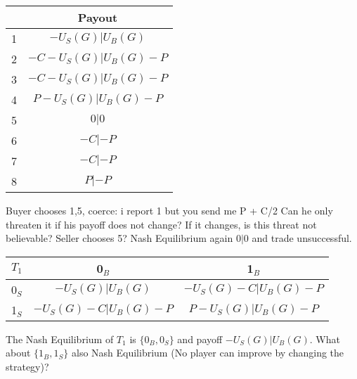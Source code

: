 \documentclass{cacthesis}
\begin{document}
\begin{center}
\begin{tabular}{ |c|c| }
\hline
& Payout  \\
\hline
\hline
1& $-U_S(G)| U_B(G)$\\
\hline
2& $-C-U_S(G)|U_B(G) -P$\\
\hline
3&$-C-U_S(G)|U_B(G)-P$ \\
\hline
4& $P-U_S(G)| U_B(G) - P$\\
\hline
5& $0|0$\\
\hline 
6& $-C | -P$\\
\hline
7& $-C|-P$\\
\hline
8& $P| -P$\\
\hline
\end{tabular}
\end{center}

Buyer chooses 1,5, coerce: i report 1 but you send me P + C/2\newline
Can he only threaten it if his payoff does not change? If it changes, is this threat not believable?\newline
Seller chooses 5?\newline
Nash Equilibrium again $0|0$ and trade unsuccessful. 


\begin{center}
\begin{tabular}{ c||c|c| }
$T_1$& 0$_B$ & 1$_B$   \\
\hline
\hline
0$_S$ & $-U_S(G) | U_B(G)$ & $-U_S(G) - C | U_B(G) - P$ \\
\hline
1$_S$ & $-U_S(G) - C | U_B(G) - P$ & $P - U_S(G) | U_B(G) - P$\\ 
\hline
\end{tabular}
\end{center}

The Nash Equilibrium of $T_1$ is $\{0_B, 0_S\}$ and payoff $-U_S(G) | U_B(G)$. What about $\{1_B, 1_S\}$ also Nash Equilibrium (No player can improve by changing the strategy)? 
\end{document}
